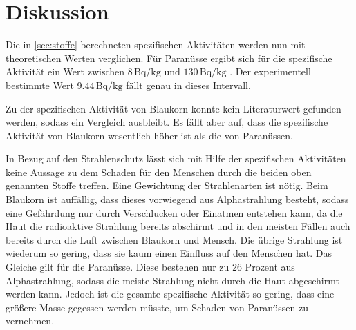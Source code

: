 \section{Diskussion}
\label{sec:Diskussion}

Die in \autoref{sec:stoffe} berechneten spezifischen Aktivitäten werden nun mit theoretischen Werten verglichen. Für Paranüsse ergibt sich für die spezifische 
Aktivität ein Wert zwischen $8\,\unit{\becquerel\per\kilo\gram}$ und $130\,\unit{\becquerel\per\kilo\gram}$ \cite{ap700}. Der experimentell bestimmte Wert 
$9.44\,\unit{\becquerel\per\kilo\gram}$ fällt genau in dieses Intervall.

Zu der spezifischen Aktivität von Blaukorn konnte kein Literaturwert gefunden werden, sodass ein Vergleich ausbleibt. Es fällt aber auf, dass die 
spezifische Aktivität von Blaukorn wesentlich höher ist als die von Paranüssen. 

In Bezug auf den Strahlenschutz lässt sich mit Hilfe  der spezifischen Aktivitäten keine Aussage zu dem Schaden für den Menschen durch die beiden oben genannten 
Stoffe treffen. Eine Gewichtung der Strahlenarten ist nötig. Beim Blaukorn ist auffällig, dass dieses vorwiegend aus Alphastrahlung besteht, sodass eine 
Gefährdung nur durch Verschlucken oder Einatmen entstehen kann, da die Haut die radioaktive Strahlung bereits abschirmt und in den meisten Fällen auch bereits 
durch die Luft zwischen Blaukorn und Mensch. Die übrige Strahlung ist wiederum so gering, dass sie kaum einen Einfluss auf den Menschen hat. Das Gleiche 
gilt für die Paranüsse. Diese bestehen nur zu 26 Prozent aus Alphastrahlung, sodass die meiste Strahlung nicht durch die Haut abgeschirmt werden kann. 
Jedoch ist die gesamte spezifische Aktivität so gering, dass eine größere Masse gegessen werden müsste, um Schaden von Paranüssen zu vernehmen.